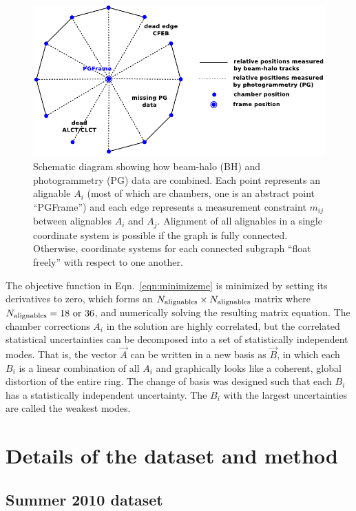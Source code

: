 \documentclass[12pt]{article}
\newcommand{\s}[1]{{\mbox{\scriptsize #1}}}
\begin{document}
\begin{figure}
\begin{center}
\includegraphics[width=0.9\linewidth]{beamhalo-PG.pdf}
\end{center}
\caption{Schematic diagram showing how beam-halo (BH) and
  photogrammetry (PG) data are combined.  Each point represents an
  alignable $A_i$ (most of which are chambers, one is an abstract
  point ``PGFrame'') and each edge represents a measurement constraint
  $m_{ij}$ between alignables $A_i$ and $A_j$.  Alignment of all
  alignables in a single coordinate system is possible if the graph is
  fully connected.  Otherwise, coordinate systems for each connected
  subgraph ``float freely'' with respect to one another. \label{fig:beamhalo-PG}}
\end{figure}

The objective function in Eqn.~\ref{eqn:minimizeme} is minimized by
setting its derivatives to zero, which forms an
$N_\s{alignables}\times N_\s{alignables}$ matrix where
$N_\s{alignables} = 18\mbox{ or }36$, and numerically solving the
resulting matrix equation.  The chamber corrections $A_i$ in the
solution are highly correlated, but the correlated statistical
uncertainties can be decomposed into a set of statistically
independent modes.  That is, the vector $\vec{A}$ can be written in a
new basis as $\vec{B}$, in which each $B_i$ is a linear combination of
all $A_i$ and graphically looks like a coherent, global distortion of
the entire ring.  The change of basis was designed such that each
$B_i$ has a statistically independent uncertainty.  The $B_i$ with the
largest uncertainties are called the weakest modes.

\section{Details of the dataset and method}

\subsection{Summer 2010 dataset}
\end{document}
